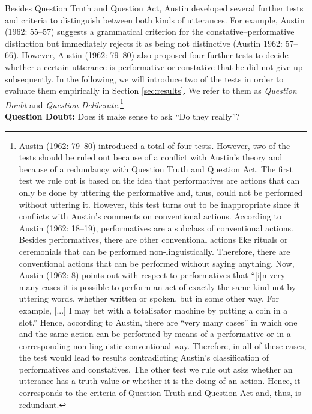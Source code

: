 \documentclass[egregdoesnotlikesansseriftitles,12pt]{scrartcl}
\begin{document}
Besides Question Truth and Question Act, Austin developed several further tests and criteria to distinguish between both kinds of utterances. For example, Austin (1962: 55--57) suggests a grammatical criterion for the constative--performative distinction but immediately rejects it as being not distinctive (Austin 1962: 57--66). However, Austin (1962: 79--80) also proposed four further tests to decide whether a certain utterance is performative or constative that he did not give up subsequently. In the following, we will introduce two of the tests in order to evaluate them empirically in Section \ref{sec:results}. We refer to them as \textit{Question Doubt} and \textit{Question Deliberate}.\footnote{Austin (1962: 79--80) introduced a total of four tests. However, two of the tests should be ruled out because of a conflict with Austin's theory and because of a redundancy with Question Truth and Question Act. The first test we rule out is based on the idea that performatives are actions that can only be done by uttering the performative and, thus, could not be performed without uttering it. However, this test turns out to be inappropriate since it conflicts with Austin's comments on conventional actions. According to Austin (1962: 18--19), performatives are a subclass of conventional actions. Besides performatives, there are other conventional actions like rituals or ceremonials that can be performed non-linguistically. Therefore, there are conventional actions that can be performed without saying anything. Now, Austin (1962: 8) points out with respect to performatives that ``[i]n very many cases it is possible to perform an act of exactly the same kind not by uttering words, whether written or spoken, but in some other way. For example, [...] I may bet with a totalisator machine by putting a coin in a slot.'' Hence, according to Austin, there are ``very many cases'' in which one and the same action can be performed by means of a performative or in a corresponding non-linguistic conventional way. Therefore, in all of these cases, the test would lead to results contradicting Austin's classification of performatives and constatives. The other test we rule out asks whether an utterance has a truth value or whether it is the doing of an action. Hence, it corresponds to the criteria of Question Truth and Question Act and, thus, is redundant.}\\

\textbf{Question Doubt:} Does it make sense to ask ``Do they really''?\\
\end{document}
